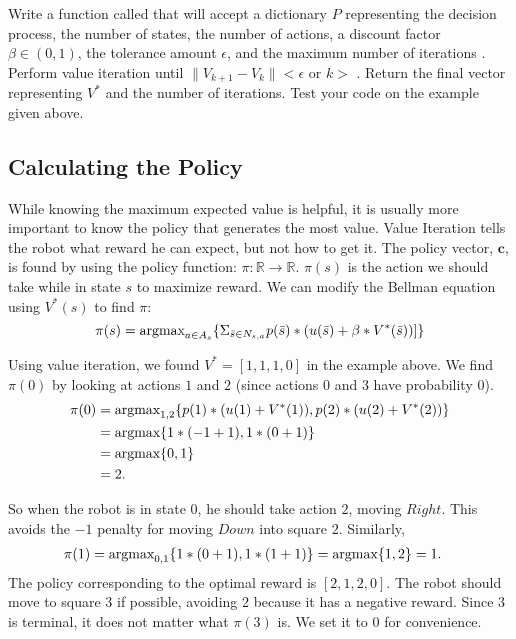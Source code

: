 \begin{problem}
\label{prob:policyiter-value1}
Write a function called  that will accept a dictionary $P$ representing the decision process, the number of states, the number of actions, a discount factor $\beta \in (0,1)$,
the tolerance amount $\epsilon$, and the maximum number of iterations .
Perform value iteration until $\|V_{k+1} - V_{k}\| < \epsilon$ or $k > $ .
Return the final vector representing $V^*$ and the number of iterations.
Test your code on the example given above.
\end{problem}

\subsection*{Calculating the Policy}

While knowing the maximum expected value is helpful, it is usually more important to know the policy that generates the most value.
Value Iteration tells the robot what reward he can expect, but not how to get it.
The policy vector, $\mathbf{c}$, is found by using the policy function: $\pi : \mathbb{R} \to \mathbb{R}$.
$\pi(s)$ is the action we should take while in state $s$ to maximize reward.
We can modify the Bellman equation using $V^*(s)$ to find $\pi$:
\begin{equation}
\label{eq:policyiter-pol_func}
\pi(s) = \mbox{argmax}_{a \in A_s} \{\Sigma_{\bar{s}\in N_{s,a}} p(\bar{s})*(u(\bar{s}) + \beta*V^*(\bar{s}))]\}
\end{equation}

Using value iteration, we found $V^*  = [1, 1, 1, 0]$ in the example above.
We find $\pi(0)$ by looking at actions $1$ and $2$ (since actions 0 and 3 have probability 0).
\begin{align*}
\pi(0) &=\mbox{argmax}_{1,2} \{p(1)*(u(1) + V^*(1)), p(2)*(u(2)+V^*(2))\} \\
&= \mbox{argmax} \{1*(-1+1), 1*(0+1)\} \\
&= \mbox{argmax}\{0, 1\}\\
&= 2.
\end{align*}

So when the robot is in state $0$, he should take action $2$, moving $Right$.
This avoids the $-1$ penalty for moving $Down$ into square $2$.
Similarly,
\begin{align*}
\pi(1) &= \mbox{argmax}_{0,1} \{1*(0+1), 1*(1+1)\} = \mbox{argmax} \{1, 2\} = 1.
\end{align*}
The policy corresponding to the optimal reward is $[2,1,2,0]$.
The robot should move to square $3$ if possible, avoiding $2$ because it has a negative reward.
Since $3$ is terminal, it does not matter what $\pi(3)$ is.
We set it to $0$ for convenience.

